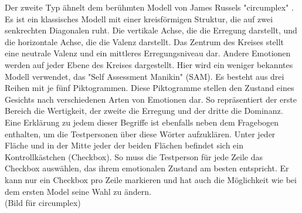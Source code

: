 Der zweite Typ ähnelt dem berühmten Modell von James Russels "circumplex" \cite{russel_1980}. Es ist ein klassisches Modell mit einer kreisförmigen Struktur, die auf zwei senkrechten Diagonalen ruht. Die vertikale Achse, die die Erregung darstellt, und die horizontale Achse, die die Valenz darstellt. Das Zentrum des Kreises stellt eine neutrale Valenz und ein mittleres Erregungsniveau dar. Andere Emotionen werden auf jeder Ebene des Kreises dargestellt.  Hier wird ein weniger bekanntes Modell verwendet, das "Self Assessment Manikin" (SAM). Es besteht aus drei Reihen mit je fünf Piktogrammen. Diese Piktogramme stellen den Zustand eines Gesichts nach verschiedenen Arten von Emotionen dar. So repräsentiert der erste Bereich die Wertigkeit, der zweite die Erregung und der dritte die Dominanz. Eine Erklärung zu jedem dieser Begriffe ist ebenfalls neben dem Fragebogen enthalten, um die Testpersonen über diese Wörter aufzuklären.  Unter jeder Fläche und in der Mitte jeder der beiden Flächen befindet sich ein Kontrollkästchen (Checkbox).  So muss die Testperson für jede Zeile das Checkbox auswählen, das ihrem emotionalen Zustand am besten entspricht. Er kann nur ein Checkbox pro Zeile markieren und hat auch die Möglichkeit wie bei dem ersten Model seine Wahl zu ändern. \\

(Bild für circumplex)